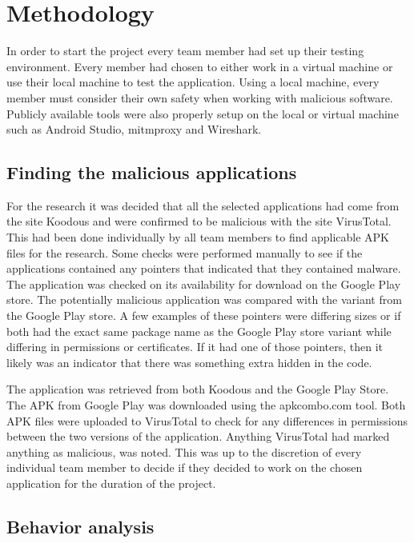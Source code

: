 \section{Methodology}

In order to start the project every team member had set up their testing environment. Every member had chosen to either work in a virtual machine or use their local machine to test the application. Using a local machine, every member must consider their own safety when working with malicious software. Publicly available tools were also properly setup on the local or virtual machine such as Android Studio, mitmproxy and Wireshark.

\subsection{Finding the malicious applications}

For the research it was decided that all the selected applications had come from the site Koodous and were confirmed to be malicious with the site VirusTotal. This had been done individually by all team members to find applicable APK files for the research. Some checks were performed manually to see if the applications contained any pointers that indicated that they contained malware. The application was checked on its availability for download on the Google Play store. The potentially malicious application was compared with the variant from the Google Play store. A few examples of these pointers were differing sizes or if both had the exact same package name as the Google Play store variant while differing in permissions or certificates. If it had one of those pointers, then it likely was an indicator that there was something extra hidden in the code.

The application was retrieved from both Koodous and the Google Play Store. The APK from Google Play was downloaded using the apkcombo.com tool. Both APK files were uploaded to VirusTotal to check for any differences in permissions between the two versions of the application. Anything VirusTotal had marked anything as malicious, was noted. This was up to the discretion of every individual team member to decide if they decided to work on the chosen application for the duration of the project.

\subsection{Behavior analysis}


